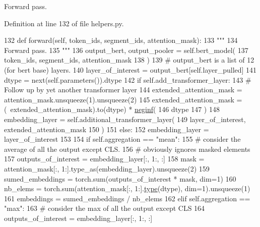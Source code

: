 \begin{DoxyVerb}Forward pass.
\end{DoxyVerb}
 

Definition at line 132 of file helpers.\+py.


\begin{DoxyCode}
132     \textcolor{keyword}{def }forward(self, token\_ids, segment\_ids, attention\_mask):
133         \textcolor{stringliteral}{"""}
134 \textcolor{stringliteral}{        Forward pass.}
135 \textcolor{stringliteral}{        """}
136         output\_bert, output\_pooler = self.bert\_model(
137             token\_ids, segment\_ids, attention\_mask
138         )
139         \textcolor{comment}{# output\_bert is a list of 12 (for bert base) layers.}
140         layer\_of\_interest = output\_bert[self.layer\_pulled]
141         dtype = next(self.parameters()).dtype
142         \textcolor{keywordflow}{if} self.add\_transformer\_layer:
143             \textcolor{comment}{# Follow up by yet another transformer layer}
144             extended\_attention\_mask = attention\_mask.unsqueeze(1).unsqueeze(2)
145             extended\_attention\_mask = (~extended\_attention\_mask).to(dtype) * 
      \hyperlink{namespaceparlai_1_1utils_1_1misc_a68c44ca571de7149b683539db659c330}{neginf}(
146                 dtype
147             )
148             embedding\_layer = self.additional\_transformer\_layer(
149                 layer\_of\_interest, extended\_attention\_mask
150             )
151         \textcolor{keywordflow}{else}:
152             embedding\_layer = layer\_of\_interest
153 
154         \textcolor{keywordflow}{if} self.aggregation == \textcolor{stringliteral}{"mean"}:
155             \textcolor{comment}{#  consider the average of all the output except CLS.}
156             \textcolor{comment}{# obviously ignores masked elements}
157             outputs\_of\_interest = embedding\_layer[:, 1:, :]
158             mask = attention\_mask[:, 1:].type\_as(embedding\_layer).unsqueeze(2)
159             sumed\_embeddings = torch.sum(outputs\_of\_interest * mask, dim=1)
160             nb\_elems = torch.sum(attention\_mask[:, 1:].\hyperlink{namespaceparlai_1_1agents_1_1tfidf__retriever_1_1build__tfidf_ad5dfae268e23f506da084a9efb72f619}{type}(dtype), dim=1).unsqueeze(1)
161             embeddings = sumed\_embeddings / nb\_elems
162         \textcolor{keywordflow}{elif} self.aggregation == \textcolor{stringliteral}{"max"}:
163             \textcolor{comment}{#  consider the max of all the output except CLS}
164             outputs\_of\_interest = embedding\_layer[:, 1:, :]

\end{DoxyCode}
